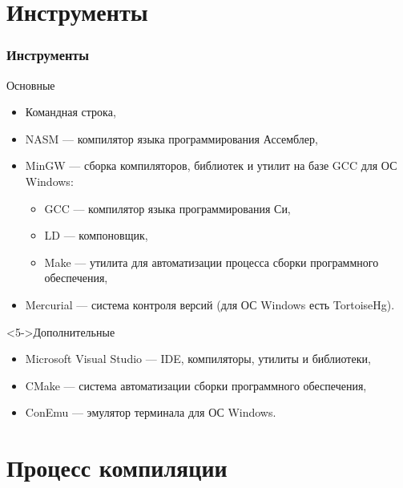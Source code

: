 \documentclass[pdf,9pt,aspectratio=169]{beamer}
\begin{document}
\section{Инструменты}

\begin{frame}\frametitle{Инструменты}
  \begin{block}{Основные}
    \begin{itemize}
      \item<1-> Командная строка,
      \item<2-> NASM --- компилятор языка программирования Ассемблер,
      \item<3-> MinGW --- сборка компиляторов, библиотек и утилит на базе GCC для ОС Windows:
      \begin{itemize}
        \item GCC --- компилятор языка программирования Си,
        \item LD --- компоновщик,
        \item Make --- утилита для автоматизации процесса сборки программного обеспечения,
      \end{itemize}
      \item<4-> Mercurial --- система контроля версий (для ОС Windows есть TortoiseHg).
    \end{itemize}      
  \end{block}
  \begin{block}<5->{Дополнительные}
    \begin{itemize}
      \item Microsoft Visual Studio --- IDE, компиляторы, утилиты и библиотеки,
      \item CMake --- система автоматизации сборки программного обеспечения,
      \item ConEmu --- эмулятор терминала для ОС Windows.
    \end{itemize}      
  \end{block}
\end{frame}

\section{Процесс компиляции}
\end{document}
